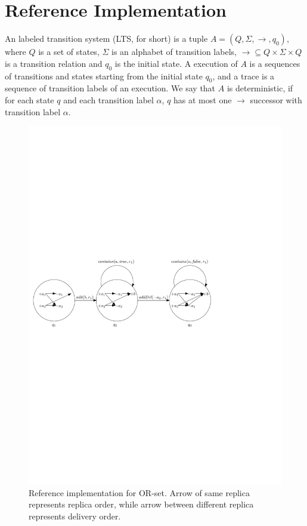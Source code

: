 
\section{Reference Implementation}
\label{sec:reference implementation}


An labeled transition system (LTS, for short) is a tuple $A = (Q,\Sigma,\rightarrow,q_0)$, where $Q$ is a set of states, $\Sigma$ is an alphabet of transition labels, $\rightarrow \subseteq Q \times \Sigma \times Q$ is a transition relation and $q_0$ is the initial state. A execution of $A$ is a sequences of transitions and states starting from the initial state $q_0$, and a trace is a sequence of transition labels of an execution. We say that $A$ is deterministic, if for each state $q$ and each transition label $\alpha$, $q$ has at most one $\rightarrow$ successor with transition label $\alpha$. 


\begin{figure}[t]
  \centering
  \includegraphics[width=0.8 \textwidth]{figures/PIC-RImp.pdf}
  \caption{Reference implementation for OR-set. Arrow of same replica represents replica order, while arrow between different replica represents delivery order.}
  \label{fig:reference implementation for OR-set}
\end{figure}

